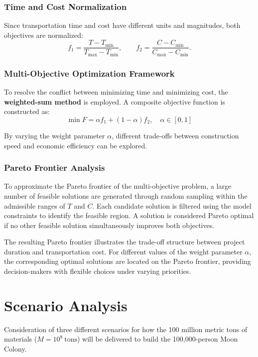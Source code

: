 \documentclass[12pt]{mcmthesis}
\begin{document}
\subsubsection{Time and Cost Normalization}

Since transportation time and cost have different units and magnitudes, both objectives are normalized:
\[
    f_1 = \frac{T - T_{\min}}{T_{\max} - T_{\min}}, \qquad
    f_2 = \frac{C - C_{\min}}{C_{\max} - C_{\min}}.
\]

\subsubsection{Multi-Objective Optimization Framework}

To resolve the conflict between minimizing time and minimizing cost, the \textbf{weighted-sum method} is employed.
A composite objective function is constructed as:
\[
    \min F = \alpha f_1
    + (1-\alpha)f_2, \quad \alpha \in [0,1]
\]

By varying the weight parameter $\alpha$, different trade-offs between construction speed and economic efficiency can be explored.

\subsubsection{Pareto Frontier Analysis}

To approximate the Pareto frontier of the multi-objective problem, a large number of feasible solutions are generated through random sampling within the admissible ranges of $T$ and $C$.
Each candidate solution is filtered using the model constraints to identify the feasible region.
A solution is considered Pareto optimal if no other feasible solution simultaneously improves both objectives.

The resulting Pareto frontier illustrates the trade-off structure between project duration and transportation cost.
For different values of the weight parameter $\alpha$, the corresponding optimal solutions are located on the Pareto frontier, providing decision-makers with flexible choices under varying priorities.



\section{Scenario Analysis}

Consideration of three different scenarios for how the 100 million metric tons of materials ($M=10^8\ \text{tons}$) will
be delivered to build the 100,000-person Moon Colony.
\end{document}
